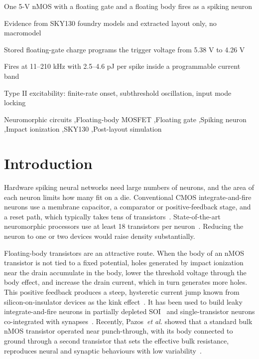 \documentclass[a4paper,fleqn]{cas-dc}
\begin{document}
\begin{highlights}
\item One 5-V nMOS with a floating gate and a floating body fires as a spiking neuron
\item Evidence from SKY130 foundry models and extracted layout only, no macromodel
\item Stored floating-gate charge programs the trigger voltage from 5.38 V to 4.26 V
\item Fires at 11--210 kHz with 2.5--4.6 pJ per spike inside a programmable current band
\item Type II excitability: finite-rate onset, subthreshold oscillation, input mode locking
\end{highlights}

\begin{keywords}
Neuromorphic circuits \sep Floating-body MOSFET \sep Floating gate \sep Spiking neuron \sep Impact ionization \sep SKY130 \sep Post-layout simulation
\end{keywords}

\maketitle

\section{Introduction}
\label{sec:intro}

Hardware spiking neural networks need large numbers of neurons, and the area of each neuron limits how many fit on a die. Conventional CMOS integrate-and-fire neurons use a membrane capacitor, a comparator or positive-feedback stage, and a reset path, which typically takes tens of transistors~\cite{indiveri2011,mead1989}. State-of-the-art neuromorphic processors use at least 18 transistors per neuron~\cite{pazos2025}. Reducing the neuron to one or two devices would raise density substantially.

Floating-body transistors are an attractive route. When the body of an nMOS transistor is not tied to a fixed potential, holes generated by impact ionization near the drain accumulate in the body, lower the threshold voltage through the body effect, and increase the drain current, which in turn generates more holes. This positive feedback produces a steep, hysteretic current jump known from silicon-on-insulator devices as the kink effect~\cite{boudou1987,park2018kink}. It has been used to build leaky integrate-and-fire neurons in partially depleted SOI~\cite{dutta2017,chavan2020} and single-transistor neurons co-integrated with synapses~\cite{han2021,woo2020}. Recently, Pazos~\textit{et al.} showed that a standard bulk nMOS transistor operated near punch-through, with its body connected to ground through a second transistor that sets the effective bulk resistance, reproduces neural and synaptic behaviours with low variability~\cite{pazos2025}.
\end{document}
